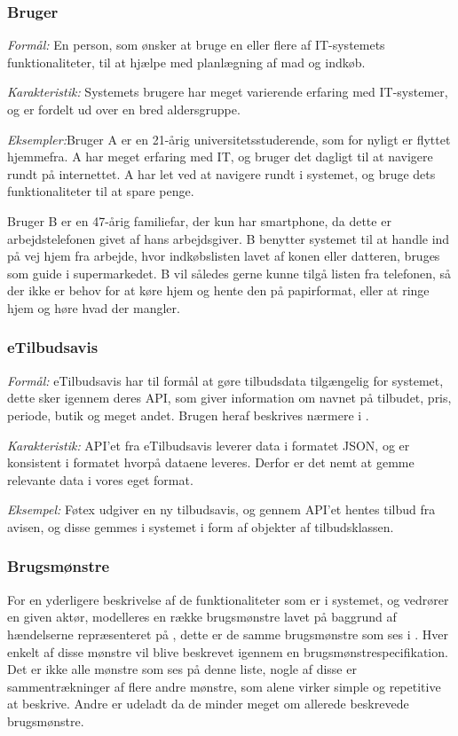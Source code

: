 \subsubsection*{Bruger}

\textit{Formål:} En person, som ønsker at bruge en eller flere af IT-systemets funktionaliteter, til at hjælpe med planlægning af mad og indkøb.

\textit{Karakteristik:} Systemets brugere har meget varierende erfaring med IT-systemer, og er fordelt ud over en bred aldersgruppe.

\textit{Eksempler:}Bruger A er en 21-årig universitetsstuderende, som for nyligt er flyttet hjemmefra. A har meget erfaring med IT, og bruger det dagligt til at navigere rundt på internettet.
A har let ved at navigere rundt i systemet, og bruge dets funktionaliteter til at spare penge.

Bruger B er en 47-årig familiefar, der kun har smartphone, da dette er arbejdstelefonen givet af hans arbejdsgiver.
B benytter systemet til at handle ind på vej hjem fra arbejde, hvor indkøbslisten lavet af konen eller datteren, bruges som guide i supermarkedet.
B vil således gerne kunne tilgå listen fra telefonen, så der ikke er behov for at køre hjem og hente den på papirformat, eller at ringe hjem og høre hvad der mangler.

\subsubsection*{eTilbudsavis}

\textit{Formål:} eTilbudsavis har til formål at gøre tilbudsdata tilgængelig for systemet, dette sker igennem deres API, som giver information om navnet på tilbudet, pris, periode, butik og meget andet. 
Brugen heraf beskrives nærmere i .

\textit{Karakteristik:} API'et fra eTilbudsavis leverer data i formatet JSON, og er konsistent i formatet hvorpå dataene leveres. 
Derfor er det nemt at gemme relevante data i vores eget format.

\textit{Eksempel:} Føtex udgiver en ny tilbudsavis, og gennem API'et hentes tilbud fra avisen, og disse gemmes i systemet i form af objekter af tilbudsklassen.

\subsubsection*{Brugsmønstre}
For en yderligere beskrivelse af de funktionaliteter som er i systemet, og vedrører en given aktør, modelleres en række brugsmønstre lavet på baggrund af hændelserne repræsenteret på , dette er de samme brugsmønstre som ses i .
Hver enkelt af disse mønstre vil blive beskrevet igennem en brugsmønstrespecifikation.
Det er ikke alle mønstre som ses på denne liste, nogle af disse er sammentrækninger af flere andre mønstre, som alene virker simple og repetitive at beskrive.
Andre er udeladt da de minder meget om allerede beskrevede brugsmønstre.

